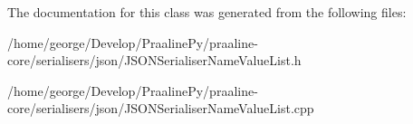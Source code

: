 The documentation for this class was generated from the following files\+:\begin{DoxyCompactItemize}
\item 
/home/george/\+Develop/\+Praaline\+Py/praaline-\/core/serialisers/json/J\+S\+O\+N\+Serialiser\+Name\+Value\+List.\+h\item 
/home/george/\+Develop/\+Praaline\+Py/praaline-\/core/serialisers/json/J\+S\+O\+N\+Serialiser\+Name\+Value\+List.\+cpp\end{DoxyCompactItemize}
